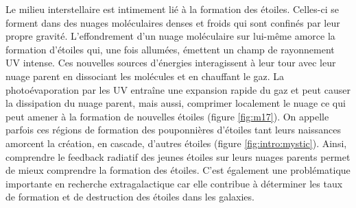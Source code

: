 \documentclass[11pt,a4paper]{article}
\begin{document}
\begin{spacing}{0.98}

Le milieu interstellaire est intimement lié à la formation des étoiles. Celles-ci se forment dans des nuages moléculaires denses et froids qui sont confinés par leur propre gravité. L'effondrement d'un nuage moléculaire sur lui-même amorce la formation d'étoiles qui, une fois allumées, émettent un champ de rayonnement UV intense. Ces nouvelles sources d'énergies interagissent à leur tour avec leur nuage parent en dissociant les molécules et en chauffant le gaz. La photoévaporation par les UV entraîne une expansion rapide du gaz et peut causer la dissipation du nuage parent, mais aussi, comprimer localement le nuage ce qui peut amener à la formation de nouvelles étoiles (figure \ref{fig:m17}). On appelle parfois ces régions de formation des \og pouponnières d'étoiles \fg{} tant leurs naissances amorcent la création, en cascade, d'autres étoiles (figure \ref{fig:intro:mystic}). Ainsi, comprendre le feedback radiatif des jeunes étoiles sur leurs nuages parents permet de mieux comprendre la formation des étoiles. C'est également une problématique importante en recherche extragalactique car elle contribue à déterminer les taux de formation et de destruction des étoiles dans les galaxies. \newline 



\end{spacing}
\end{document}
